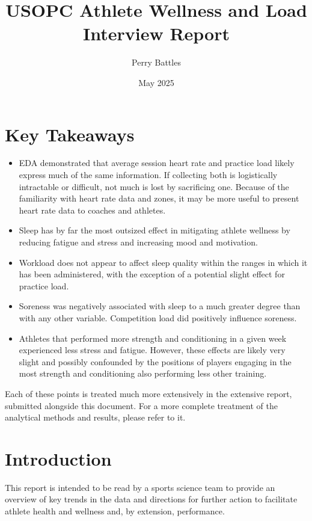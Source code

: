 \documentclass{article}
\title{USOPC Athlete Wellness and Load Interview Report}
\author{Perry Battles}
\date{May 2025}
\begin{document}
	\maketitle


	\section{Key Takeaways}

		\begin{itemize}
			\item EDA demonstrated that average session heart rate and
			practice load likely express much of the same information.
			If collecting both is logistically intractable or difficult,
			not much is lost by sacrificing one. Because of the familiarity
			with heart rate data and zones, it may be more useful to present
			heart rate data to coaches and athletes.
			\item Sleep has by far the most outsized effect in mitigating
			athlete wellness by reducing fatigue and stress and increasing
			mood and motivation.
			\item Workload does not appear to affect sleep quality within
			the ranges in which it has been administered,
			with the exception of a potential
			slight effect for practice load.
			\item Soreness was negatively associated with sleep to a much
			greater degree than with any other variable.
			Competition load did positively influence soreness.
			\item Athletes that performed more strength and conditioning
			in a given week experienced less stress
			and fatigue.
			However, these effects are likely very slight and possibly
			confounded by the positions of players engaging in the most
			strength and conditioning also performing less other training.
		\end{itemize}

		Each of these points is treated much more extensively in the
		extensive report, submitted alongside this document. For a
		more complete treatment of the analytical methods and results,
		please refer to it.

	\section{Introduction}

		This report is intended to be read by a sports science team to provide
		an overview of key trends in the data and directions for further action
		to facilitate athlete health and wellness and, by extension, performance.
\end{document}
